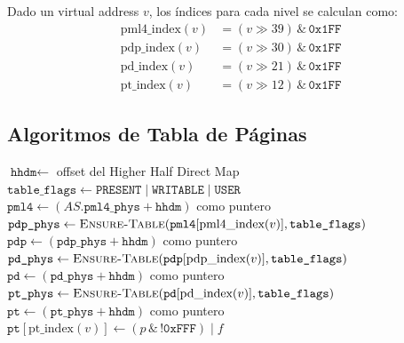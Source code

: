 \documentclass[11pt,twoside,openright]{book}
\theoremstyle{definition}
\theoremstyle{plain}
\theoremstyle{remark}
\newcommand{\bitor}{\mathbin{|}}
\begin{document}
Dado un virtual address $v$, los índices para cada nivel se calculan como:
\begin{align}
    \text{pml4\_index}(v) &= (v \gg 39) \,\texttt{\&}\, \texttt{0x1FF} \label{eq:pml4-idx} \\
    \text{pdp\_index}(v)  &= (v \gg 30) \,\texttt{\&}\, \texttt{0x1FF} \label{eq:pdp-idx} \\
    \text{pd\_index}(v)   &= (v \gg 21) \,\texttt{\&}\, \texttt{0x1FF} \label{eq:pd-idx} \\
    \text{pt\_index}(v)   &= (v \gg 12) \,\texttt{\&}\, \texttt{0x1FF} \label{eq:pt-idx}
\end{align}

\subsection{Algoritmos de Tabla de Páginas}

\begin{algorithm}[H]
\caption{\textsc{Map-Page}: Mapear una página virtual a un marco físico}
\label{alg:map-page}
$\texttt{hhdm} \leftarrow$ offset del Higher Half Direct Map \\
$\texttt{table\_flags} \leftarrow \texttt{PRESENT} \bitor \texttt{WRITABLE} \bitor \texttt{USER}$ \\[4pt]
$\texttt{pml4} \leftarrow (\mathit{AS}.\texttt{pml4\_phys} + \texttt{hhdm})$ como puntero \\
$\texttt{pdp\_phys} \leftarrow \textsc{Ensure-Table}(\texttt{pml4}[\text{pml4\_index}(v)], \texttt{table\_flags})$ \\[4pt]
$\texttt{pdp} \leftarrow (\texttt{pdp\_phys} + \texttt{hhdm})$ como puntero \\
$\texttt{pd\_phys} \leftarrow \textsc{Ensure-Table}(\texttt{pdp}[\text{pdp\_index}(v)], \texttt{table\_flags})$ \\[4pt]
$\texttt{pd} \leftarrow (\texttt{pd\_phys} + \texttt{hhdm})$ como puntero \\
$\texttt{pt\_phys} \leftarrow \textsc{Ensure-Table}(\texttt{pd}[\text{pd\_index}(v)], \texttt{table\_flags})$ \\[4pt]
$\texttt{pt} \leftarrow (\texttt{pt\_phys} + \texttt{hhdm})$ como puntero \\
$\texttt{pt}[\text{pt\_index}(v)] \leftarrow (p \,\texttt{\&}\, \texttt{!0xFFF}) \bitor f$
\end{algorithm}
\end{document}
